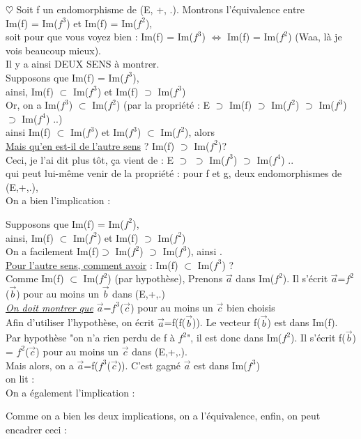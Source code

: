 \documentclass[a4paper,10pt]{article}
\begin{document}
 $\heartsuit$ Soit f un endomorphisme de (E, +, .). Montrons l'équivalence entre \\
Im(f) = Im($f^3$) et Im(f) = Im($f^2$), \\
soit pour que vous voyez bien : Im(f) = Im($f^3$) $\Leftrightarrow$ Im(f) = Im($f^2$) (Waa, là je vois beaucoup mieux).\\

Il y a ainsi DEUX SENS à montrer. \\

\fbox{$\Rightarrow$} Supposons que Im(f) = Im($f^3$), \\
ainsi,
Im(f) $\subset$ Im($f^3$) et Im(f) $\supset$ Im($f^3$)\\
Or, on a Im($f^3$) $\subset$ Im($f^2$) (par la propriété : E $\supset$ Im(f) $\supset$ Im($f^2$) $\supset$ Im($f^3$) $\supset$ Im($f^4$) ..)\\ ainsi Im(f) $\subset$ Im($f^3$) et Im($f^3$) $\subset$ Im($f^2$), alors \\
\underline{Mais qu'en est-il de l'autre sens} ? Im(f) $\supset$ Im($f^2$)?\\
Ceci, je l'ai dit plus tôt, ça vient de : E $\supset$ 
 $\supset$ Im($f^3$) $\supset$ Im($f^4$) .. \\
qui peut lui-même venir de la propriété : pour f et g, deux endomorphismes de (E,+,.), \\
On a bien l'implication : 

\fbox{$\Leftarrow$} Supposons que Im(f) = Im($f^2$),\\
ainsi,
Im(f) $\subset$ Im($f^2$) et Im(f) $\supset$ Im($f^2$)\\
On a facilement Im(f)$\supset$ Im($f^2$) $\supset$ Im($f^3$), ainsi .\\
\underline{Pour l'autre sens, comment avoir} : Im(f) $\subset$ Im($f^3$) ?\\
Comme Im(f) $\subset$ Im($f^2$) (par hypothèse), 
Prenons $\vec{a}$ dans Im($f^2$). Il s'écrit $\vec{a}$=$f^2$($\vec{b}$) pour au moins un $\vec{b}$ dans (E,+,.)\\
\underline{\textit{On doit montrer que}} $\vec{a}$=$f^3$($\vec{c}$) pour au moins un $\vec{c}$ bien choisis \\
Afin d'utiliser l'hypothèse, on écrit $\vec{a}$=f(f($\vec{b}$)). Le vecteur f($\vec{b}$) est dans Im(f).\\
Par hypothèse "on n'a rien perdu de f à $f^2$", il est donc dans Im($f^2$). Il s'écrit f($\vec{b}$) = $f^2$($\vec{c}$) pour au moins un $\vec{c}$ dans (E,+,.).\\
Mais alors, on a $\vec{a}$=f($f^3$($\vec{c}$)). C'est gagné $\vec{a}$ est dans Im($f^3$)\\
 on lit : \\
On a également l'implication : \\

\setlength{\fboxsep}{2.5 mm}
\setlength{\fboxrule}{1 mm}

Comme on a bien les deux implications, on a l'équivalence, enfin, on peut encadrer ceci : \fbox{\textcolor{red}{Im(f) = Im($f^3$) $\Leftrightarrow$ Im(f) = Im($f^2$)}}
\end{document}
